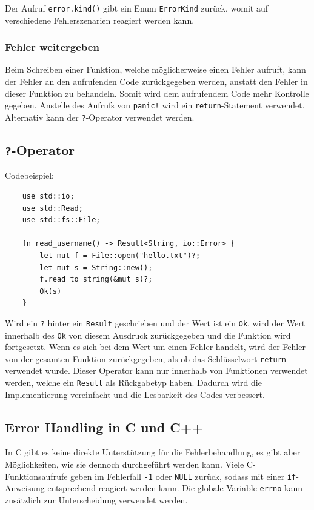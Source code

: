 Der Aufruf \verb"error.kind()" gibt ein Enum \verb"ErrorKind" zurück, womit auf verschiedene Fehlerszenarien reagiert werden kann.

\subsubsection{Fehler weitergeben}

Beim Schreiben einer Funktion, welche möglicherweise einen Fehler aufruft, kann der Fehler an den aufrufenden Code zurückgegeben werden, anstatt den Fehler in dieser Funktion zu behandeln. Somit wird dem aufrufendem Code mehr Kontrolle gegeben. Anstelle des Aufrufs von \verb"panic!" wird ein \verb"return"-Statement verwendet. Alternativ kann der \verb"?"-Operator verwendet werden.

\subsection{\texttt{?}-Operator}

Codebeispiel:

\begin{lstlisting}
    use std::io;
    use std::Read;
    use std::fs::File;

    fn read_username() -> Result<String, io::Error> {
        let mut f = File::open("hello.txt")?;
        let mut s = String::new();
        f.read_to_string(&mut s)?;
        Ok(s)
    }
\end{lstlisting}

Wird ein \verb"?" hinter ein \verb"Result" geschrieben und der Wert ist ein \verb"Ok", wird der Wert innerhalb des \verb"Ok" von diesem Ausdruck zurückgegeben und die Funktion wird fortgesetzt. Wenn es sich bei dem Wert um einen Fehler handelt, wird der Fehler von der gesamten Funktion zurückgegeben, als ob das Schlüsselwort \verb"return" verwendet wurde. Dieser Operator kann nur innerhalb von Funktionen verwendet werden, welche ein \verb"Result" als Rückgabetyp haben. Dadurch wird die Implementierung vereinfacht und die Lesbarkeit des Codes verbessert.

\subsection{Error Handling in C und C++}

In C gibt es keine direkte Unterstützung für die Fehlerbehandlung, es gibt aber Möglichkeiten, wie sie dennoch durchgeführt werden kann. Viele C-Funk\-ti\-ons\-auf\-ru\-fe geben im Fehlerfall \verb"-1" oder \verb"NULL" zurück, sodass mit einer \verb"if"-Anweisung entsprechend reagiert werden kann. Die globale Variable \verb"errno" kann zusätzlich zur Unterscheidung verwendet werden.

